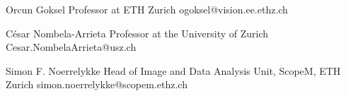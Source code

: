 
\begin{cvrefs}

\cvreference
{Orcun Goksel}
{Professor at ETH Zurich}
{ogoksel@vision.ee.ethz.ch}

\cvreference
{César Nombela-Arrieta}
{Professor at the University of Zurich}
{Cesar.NombelaArrieta@usz.ch}


\cvreference
{Simon F. Noerrelykke}
{Head of Image and Data Analysis Unit, ScopeM, ETH Zurich}
{simon.noerrelykke@scopem.ethz.ch}


\end{cvrefs}